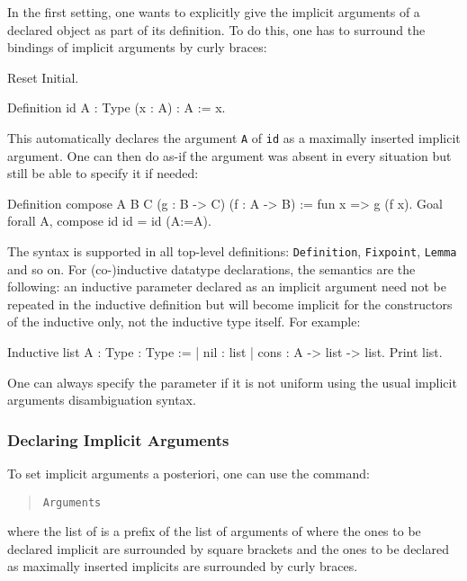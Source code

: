In the first setting, one wants to explicitly give the implicit
arguments of a declared object as part of its definition. To do this, one has
to surround the bindings of implicit arguments by curly braces:
\begin{coq_eval}
Reset Initial.
\end{coq_eval}
\begin{coq_example}
Definition id {A : Type} (x : A) : A := x.
\end{coq_example}

This automatically declares the argument {\tt A} of {\tt id} as a
maximally inserted implicit argument. One can then do as-if the argument
was absent in every situation but still be able to specify it if needed:
\begin{coq_example}
Definition compose {A B C} (g : B -> C) (f : A -> B) := 
  fun x => g (f x).
Goal forall A, compose id id = id (A:=A).
\end{coq_example}

The syntax is supported in all top-level definitions: {\tt Definition},
{\tt Fixpoint}, {\tt Lemma} and so on. For (co-)inductive datatype
declarations, the semantics are the following: an inductive parameter
declared as an implicit argument need not be repeated in the inductive
definition but will become implicit for the constructors of the
inductive only, not the inductive type itself. For example:

\begin{coq_example}
Inductive list {A : Type} : Type :=
| nil : list
| cons : A -> list -> list.
Print list.
\end{coq_example}

One can always specify the parameter if it is not uniform using the
usual implicit arguments disambiguation syntax.

\subsubsection{Declaring Implicit Arguments}

To set implicit arguments a posteriori, one can use the
command:
\begin{quote}
\tt Arguments {\qualid} \nelist{\possiblybracketedident}{}
\end{quote}
where the list of {\possiblybracketedident} is a prefix of the list of arguments
of {\qualid} where the ones to be declared implicit are surrounded by square
brackets and the ones to be declared as maximally inserted implicits are
surrounded by curly braces.

